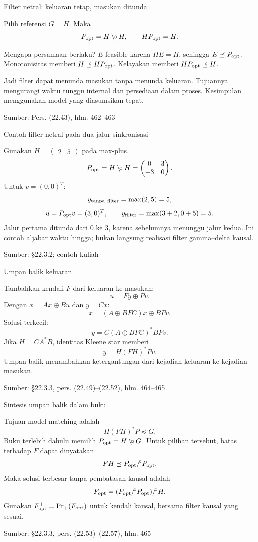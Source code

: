 \documentclass[aspectratio=169,11pt]{beamer}
\newcommand{\source}[1]{%
    \vfill
    \hfill{\tiny\color{gray}Sumber: #1}
}
\newcommand{\mpmat}[1]{\begin{pmatrix}#1\end{pmatrix}}
\newcommand{\res}{\mathbin{\backslash\!\circ}}
\begin{document}
\begin{frame}{Filter netral: keluaran tetap, masukan ditunda}

Pilih referensi $G=H$. Maka
\[
P_{\rm opt}=H\res H,\qquad HP_{\rm opt}=H.
\]
\begin{exampleblock}{Mengapa persamaan berlaku?}
$E$ feasible karena $HE=H$, sehingga $E\preceq P_{\rm opt}$.
Monotonisitas memberi $H\preceq HP_{\rm opt}$.
Kelayakan memberi $HP_{\rm opt}\preceq H$.
\end{exampleblock}
Jadi filter dapat menunda masukan tanpa menunda keluaran.
Tujuannya mengurangi waktu tunggu internal dan persediaan dalam proses.
Kesimpulan menggunakan model yang diasumsikan tepat.

\source{Pers. (22.43), hlm. 462--463}
\end{frame}
\begin{frame}{Contoh filter netral pada dua jalur sinkronisasi}

Gunakan $H=\mpmat{2&5}$ pada max-plus.
\[
P_{\rm opt}=H\res H
=\mpmat{0&3\\-3&0}.
\]
Untuk $v=(0,0)^T$:
\[
y_{\rm tanpa\ filter}=\max(2,5)=5,
\]
\[
u=P_{\rm opt}v=(3,0)^T,\qquad
y_{\rm filter}=\max(3+2,0+5)=5.
\]
Jalur pertama ditunda dari $0$ ke $3$, karena sebelumnya menunggu jalur kedua.
Ini contoh aljabar waktu hingga; bukan langsung realisasi filter gamma--delta kausal.

\source{\S22.3.2; contoh kuliah}
\end{frame}
\begin{frame}{Umpan balik keluaran}

Tambahkan kendali $F$ dari keluaran ke masukan:
\[
u=Fy\oplus Pv.
\]
Dengan $x=Ax\oplus Bu$ dan $y=Cx$:
\[
x=(A\oplus BFC)x\oplus BPv.
\]
Solusi terkecil:
\[
y=C(A\oplus BFC)^*BPv.
\]
Jika $H=CA^*B$, identitas Kleene star memberi
\[
y=H(FH)^*Pv.
\]
Umpan balik menambahkan ketergantungan dari kejadian keluaran ke kejadian masukan.

\source{\S22.3.3, pers. (22.49)--(22.52), hlm. 464--465}
\end{frame}
\begin{frame}{Sintesis umpan balik dalam buku}

Tujuan model matching adalah
\[
H(FH)^*P\preceq G.
\]
Buku terlebih dahulu memilih $P_{\rm opt}=H\res G$.
Untuk pilihan tersebut, batas terhadap $F$ dapat dinyatakan
\[
FH\preceq P_{\rm opt}/\!^\circ P_{\rm opt}.
\]
Maka solusi terbesar tanpa pembatasan kausal adalah
\[
F_{\rm opt}
=(P_{\rm opt}/\!^\circ P_{\rm opt})/\!^\circ H.
\]
Gunakan $F_{\rm opt}^{+}=\operatorname{Pr}_+(F_{\rm opt})$
untuk kendali kausal, bersama filter kausal yang sesuai.

\source{\S22.3.3, pers. (22.53)--(22.57), hlm. 465}
\end{frame}
\end{document}
